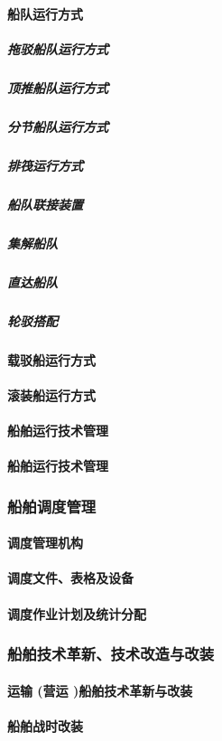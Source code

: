 \documentclass[UTF8]{../ApplicationUniverse}
\begin{document}
            \paragraph{船队运行方式}
                \subparagraph{拖驳船队运行方式}
                \subparagraph{顶推船队运行方式}
                \subparagraph{分节船队运行方式}
                \subparagraph{排筏运行方式}
                \subparagraph{船队联接装置}
                \subparagraph{集解船队}
                \subparagraph{直达船队}
                \subparagraph{轮驳搭配}
            \paragraph{载驳船运行方式}
            \paragraph{滚装船运行方式}
            \paragraph{船舶运行技术管理}
            \paragraph{船舶运行技术管理}
        \subsubsection{船舶调度管理}
            \paragraph{调度管理机构}
            \paragraph{调度文件、表格及设备}
            \paragraph{调度作业计划及统计分配}
        \subsubsection{船舶技术革新、技术改造与改装}
            \paragraph{运输 (营运 )船舶技术革新与改装}
            \paragraph{船舶战时改装}
\end{document}
